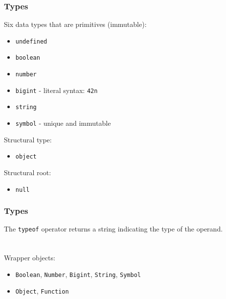 \begin{frame}[fragile]
  \frametitle{Types}
Six data types that are primitives (immutable):
\begin{itemize}
  \item  \verb|undefined|
  \item  \verb|boolean|
  \item  \verb|number|
  \item  \verb|bigint| - literal syntax: \verb|42n|
  \item  \verb|string|
  \item  \verb|symbol| - unique and immutable
\end{itemize}
Structural type:
\begin{itemize}
  \item  \verb|object|
\end{itemize}
Structural root:
\begin{itemize}
  \item  \verb|null|
\end{itemize}
\end{frame}

\begin{frame}[fragile]
  \frametitle{Types}
The \verb|typeof| operator returns a string indicating the type of the operand.
\\ \vspace{5 mm}
\\
\\ \vspace{5 mm}
Wrapper objects:
\begin{itemize}
  \item  \verb|Boolean|, \verb|Number|, \verb|Bigint|, \verb|String|, \verb|Symbol|
  \item  \verb|Object|, \verb|Function|
\end{itemize}
\vspace{5 mm}
\end{frame}


